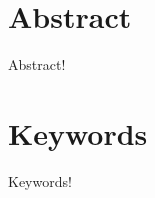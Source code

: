 \documentclass[twocolumn,12pt]{report}
\begin{document}

\setcounter{secnumdepth}{0}

\section{Abstract}
Abstract!

\section{Keywords}
Keywords!

\printglossaries

\textbf{}

\setcounter{secnumdepth}{3}
\tableofcontents












\printbibliography


\end{document}
